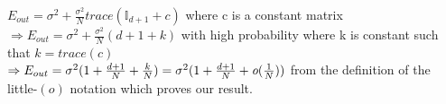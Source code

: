 \documentclass{article}
\begin{document}
$E_{out} = \sigma^2 + \frac{\sigma^2}{N}trace(\mathbb{I}_{d+1} + c)$ where c is a constant matrix \\
$ \Rightarrow E_{out} = \sigma^2 + \frac{\sigma^2}{N}(d+1 + k)$ with high probability where k is constant such that $ k = trace(c)$ 
\\ $ \Rightarrow E_{out} = \sigma^2 ( 1 + \frac{d+1}{N} + \frac{k}{N}) = \sigma^2(1+\frac{d+1}{N} + \emph{o}(\frac{1}{N}))$ from the definition of the little-$(o)$ notation which proves our result.

 
\end{document}
